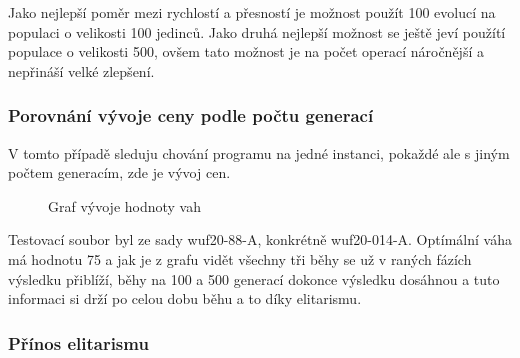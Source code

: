 \documentclass{article}
\begin{document}
    Jako nejlepší poměr mezi rychlostí a přesností je možnost použít 100 evolucí na populaci o velikosti 100 jedinců. Jako druhá nejlepší možnost se ještě jeví
    použítí populace o velikosti 500, ovšem tato možnost je na počet operací náročnější a nepřináší velké zlepšení.

    \pagebreak

    \subsubsection{Porovnání vývoje ceny podle počtu generací}

    V tomto případě sleduju chování programu na jedné instanci, pokaždé ale s jiným počtem generacím, zde je vývoj cen.

    \begin{figure}[H]
        \begin{center}
            \caption{Graf vývoje hodnoty vah}
        \end{center}
    \end{figure}

    Testovací soubor byl ze sady wuf20-88-A, konkrétně wuf20-014-A. Optímální váha má hodnotu 75 a
    jak je z grafu vidět všechny tři běhy se už v raných fázích výsledku přiblíží, běhy na 100 a 500 generací dokonce výsledku dosáhnou a tuto informaci si drží po celou dobu běhu
    a to díky elitarismu.

    \subsubsection{Přínos elitarismu}
\end{document}
